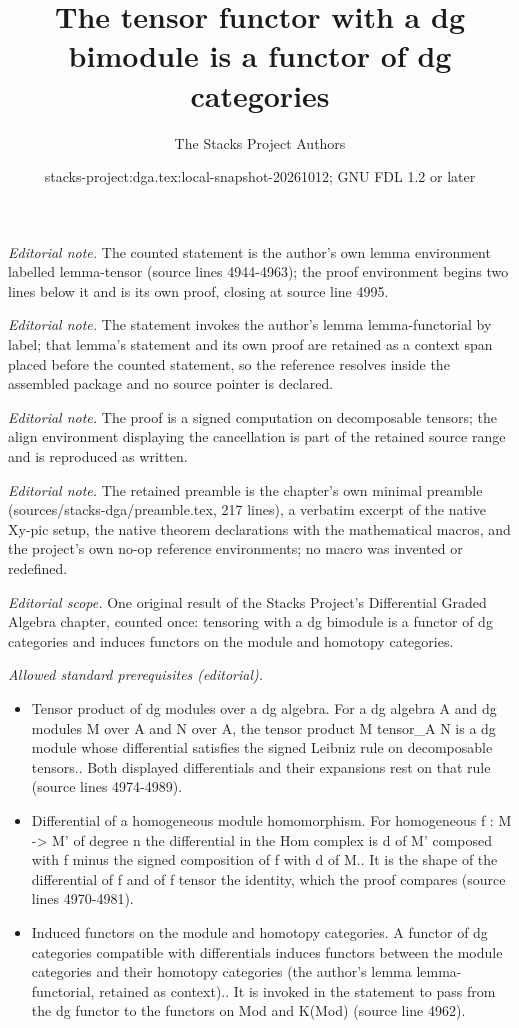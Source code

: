 \documentclass{stacks-project}
\title{The tensor functor with a dg bimodule is a functor of dg categories}
\author{The Stacks Project Authors}
\date{stacks-project:dga.tex:local-snapshot-20261012; GNU FDL 1.2 or later}
\theoremstyle{plain}
\theoremstyle{definition}
\theoremstyle{remark}
\numberwithin{equation}{subsection}
\begin{document}
\maketitle
\noindent\textit{Editorial note.} The counted statement is the author's own lemma environment labelled lemma-tensor (source lines 4944-4963); the proof environment begins two lines below it and is its own proof, closing at source line 4995.\par\medskip
\noindent\textit{Editorial note.} The statement invokes the author's lemma lemma-functorial by label; that lemma's statement and its own proof are retained as a context span placed before the counted statement, so the reference resolves inside the assembled package and no source pointer is declared.\par\medskip
\noindent\textit{Editorial note.} The proof is a signed computation on decomposable tensors; the align environment displaying the cancellation is part of the retained source range and is reproduced as written.\par\medskip
\noindent\textit{Editorial note.} The retained preamble is the chapter's own minimal preamble (sources/stacks-dga/preamble.tex, 217 lines), a verbatim excerpt of the native Xy-pic setup, the native theorem declarations with the mathematical macros, and the project's own no-op reference environments; no macro was invented or redefined.\par\medskip
\noindent\textit{Editorial scope.} One original result of the Stacks Project's Differential Graded Algebra chapter, counted once: tensoring with a dg bimodule is a functor of dg categories and induces functors on the module and homotopy categories.\par\medskip
\noindent\textit{Allowed standard prerequisites (editorial).}\begin{itemize}
\item Tensor product of dg modules over a dg algebra. For a dg algebra A and dg modules M over A and N over A, the tensor product M tensor\_A N is a dg module whose differential satisfies the signed Leibniz rule on decomposable tensors.. Both displayed differentials and their expansions rest on that rule (source lines 4974-4989).
\item Differential of a homogeneous module homomorphism. For homogeneous f : M -> M' of degree n the differential in the Hom complex is d of M' composed with f minus the signed composition of f with d of M.. It is the shape of the differential of f and of f tensor the identity, which the proof compares (source lines 4970-4981).
\item Induced functors on the module and homotopy categories. A functor of dg categories compatible with differentials induces functors between the module categories and their homotopy categories (the author's lemma lemma-functorial, retained as context).. It is invoked in the statement to pass from the dg functor to the functors on Mod and K(Mod) (source line 4962).
\end{itemize}\medskip
\end{document}

